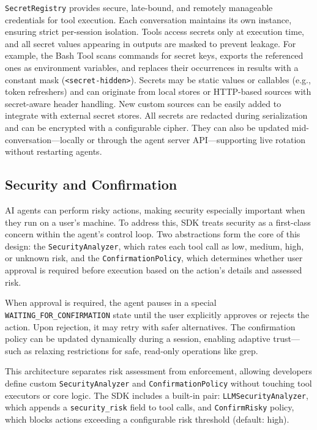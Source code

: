 \texttt{SecretRegistry} provides secure, late-bound, and remotely manageable credentials for tool execution. Each conversation maintains its own instance, ensuring strict per-session isolation. Tools access secrets only at execution time, and all secret values appearing in outputs are masked to prevent leakage. For example, the Bash Tool scans commands for secret keys, exports the referenced ones as environment variables, and replaces their occurrences in results with a constant mask (\texttt{<secret-hidden>}). Secrets may be static values or callables (e.g., token refreshers) and can originate from local stores or HTTP-based sources with secret-aware header handling. New custom sources can be easily added to integrate with external secret stores. All secrets are redacted during serialization and can be encrypted with a configurable cipher. They can also be updated mid-conversation—locally or through the agent server API—supporting live rotation without restarting agents.


\subsection{Security and Confirmation}
\label{sec:security-confirmation}

AI agents can perform risky actions, making security especially important when they run on a user’s machine. To address this, SDK treats security as a first-class concern within the agent’s control loop. Two abstractions form the core of this design: the \texttt{SecurityAnalyzer}, which rates each tool call as low, medium, high, or unknown risk, and the \texttt{ConfirmationPolicy}, which determines whether user approval is required before execution based on the action’s details and assessed risk.

When approval is required, the agent pauses in a special \texttt{WAITING\_FOR\_CONFIRMATION} state until the user explicitly approves or rejects the action. Upon rejection, it may retry with safer alternatives. The confirmation policy can be updated dynamically during a session, enabling adaptive trust—such as relaxing restrictions for safe, read-only operations like grep.

This architecture separates risk assessment from enforcement, allowing developers define custom \texttt{SecurityAnalyzer} and \texttt{ConfirmationPolicy} without touching tool executors or core logic. The SDK includes a built-in pair: \texttt{LLMSecurityAnalyzer}, which appends a \texttt{security\_risk} field to tool calls, and \texttt{ConfirmRisky} policy, which blocks actions exceeding a configurable risk threshold (default: high). 

